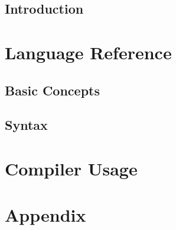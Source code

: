 \documentclass[10pt,oneside]{book}
\begin{document}

\frontmatter
\tableofcontents
\mainmatter
\chapter{Introduction}\label{sec:intro}
\part{Language Reference}
\chapter{Basic Concepts}\label{sec:basic concepts}
\chapter{Syntax}\label{sec:syntax}

\part{Compiler Usage}

\part{Appendix}
\appendix
{}
\printglossary[nonumberlist=true, style=altlist, type=main]

\end{document}
